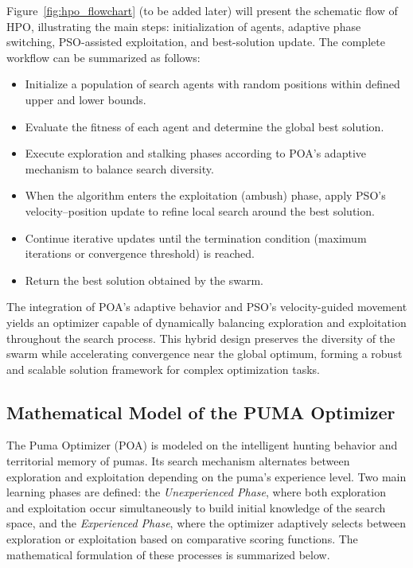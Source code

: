 \documentclass[a4paper,12pt]{article}
\begin{document}
Figure~\ref{fig:hpo_flowchart} (to be added later) will present the schematic flow of HPO, illustrating the main steps: initialization of agents, adaptive phase switching, PSO-assisted exploitation, and best-solution update. The complete workflow can be summarized as follows:
\begin{itemize}
    \item Initialize a population of search agents with random positions within defined upper and lower bounds.
    \item Evaluate the fitness of each agent and determine the global best solution.
    \item Execute exploration and stalking phases according to POA’s adaptive mechanism to balance search diversity.
    \item When the algorithm enters the exploitation (ambush) phase, apply PSO’s velocity--position update to refine local search around the best solution.
    \item Continue iterative updates until the termination condition (maximum iterations or convergence threshold) is reached.
    \item Return the best solution obtained by the swarm.
\end{itemize}

The integration of POA’s adaptive behavior and PSO’s velocity-guided movement yields an optimizer capable of dynamically balancing exploration and exploitation throughout the search process. This hybrid design preserves the diversity of the swarm while accelerating convergence near the global optimum, forming a robust and scalable solution framework for complex optimization tasks.

\subsection{Mathematical Model of the PUMA Optimizer}

The Puma Optimizer (POA) is modeled on the intelligent hunting behavior and territorial memory of pumas. Its search mechanism alternates between exploration and exploitation depending on the puma's experience level. Two main learning phases are defined: the \textit{Unexperienced Phase}, where both exploration and exploitation occur simultaneously to build initial knowledge of the search space, and the \textit{Experienced Phase}, where the optimizer adaptively selects between exploration or exploitation based on comparative scoring functions. The mathematical formulation of these processes is summarized below.
\end{document}
